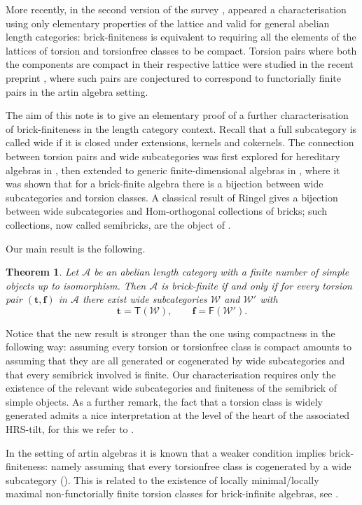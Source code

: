 \documentclass[11pt]{amsart}
\newtheorem{theorem}{Theorem}[section]
\theoremstyle{definition}
\newcommand{\A}{\mathcal A}
\newcommand{\W}{\mathcal W}
\newcommand{\T}{\mathsf T}
\newcommand{\F}{\mathsf F}
\begin{document}
More recently, in the second version of the survey \cite{RingelBrickChain}, appeared a characterisation using only elementary properties of the lattice and valid for general abelian length categories: brick-finiteness is equivalent to requiring all the elements of the lattices of torsion and torsionfree classes to be compact. Torsion pairs where both the components are compact in their respective lattice were studied in the recent preprint \cite{AsaiBicompact}, where such pairs are conjectured to correspond to functorially finite pairs in the artin algebra setting.

The aim of this note is to give an elementary proof of a further characterisation of brick-finiteness in the length category context. Recall that a full subcategory is called wide if it is closed under extensions, kernels and cokernels. The connection between torsion pairs and wide subcategories was first explored for hereditary algebras in \cite{IngallsThomas}, then extended to generic finite-dimensional algebras in \cite{MarksStovicek}, where it was shown that for a brick-finite algebra there is a bijection between wide subcategories and torsion classes. A classical result of Ringel gives a bijection between wide subcategories and Hom-orthogonal collections of bricks; such collections, now called semibricks, are the object of \cite{AsaiSemibricks}.

Our main result is the following.
\begin{theorem}\label{thm:intro-main}
Let \(\A\) be an abelian length category with a finite number of simple objects up to isomorphism. Then \(\A\) is brick-finite if and only if for every torsion pair \((\mathbf t,\mathbf f)\) in \(\A\) there exist wide subcategories \(\W\) and \(\W'\) with
\[
\mathbf t=\T(\W),\qquad \mathbf f=\F(\W').
\]
\end{theorem}

Notice that the new result is stronger than the one using compactness in the following way: assuming every torsion or torsionfree class is compact amounts to assuming that they are all generated or cogenerated by wide subcategories and that every semibrick involved is finite. Our characterisation requires only the existence of the relevant wide subcategories and finiteness of the semibrick of simple objects. As a further remark, the fact that a torsion class is widely generated admits a nice interpretation at the level of the heart of the associated HRS-tilt, for this we refer to \cite[Proposition 5.4]{Sh}.

In the setting of artin algebras it is known that a weaker condition implies brick-finiteness: namely assuming that every torsionfree class is cogenerated by a wide subcategory (\cite[Proposition 5.4]{WideCoreflective}). This is related to the existence of locally minimal/locally maximal non-functorially finite torsion classes for brick-infinite algebras, see \cite{SentieriAuslander}. 
\end{document}
